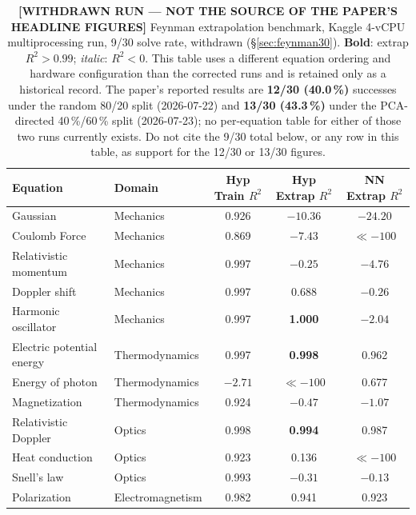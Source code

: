 \documentclass[twoside,11pt]{article}
\newcommand{\Rsq}{R^{2}}
\begin{document}
\begin{table}[h]
\centering
\caption{\textbf{[WITHDRAWN RUN --- NOT THE SOURCE OF THE PAPER'S HEADLINE FIGURES]}
  Feynman extrapolation benchmark, Kaggle 4-vCPU multiprocessing run,
  9/30 solve rate, withdrawn (\S\ref{sec:feynman30}).
  \textbf{Bold}: extrap $\Rsq > 0.99$; \emph{italic}: $\Rsq < 0$.
  This table uses a different equation ordering and hardware configuration
  than the corrected runs and is retained only as a historical record. The
  paper's reported results are \textbf{12/30 (40.0\,\%)} successes under the
  random 80/20 split (2026-07-22) and \textbf{13/30 (43.3\,\%)} under the
  PCA-directed 40\,\%/60\,\% split (2026-07-23); no per-equation table for
  either of those two runs currently exists. Do not cite the 9/30 total
  below, or any row in this table, as support for the 12/30 or 13/30 figures.}
\label{tab:feynman30-legacy}
\small\setlength{\tabcolsep}{4.5pt}
\renewcommand{\arraystretch}{1.08}
\begin{tabular}{llccc}
\toprule
\textbf{Equation} & \textbf{Domain} &
\textbf{Hyp Train $\Rsq$} & \textbf{Hyp Extrap $\Rsq$} & \textbf{NN Extrap $\Rsq$} \\
\midrule
Gaussian                  & Mechanics      & 0.926 & $-10.36$           & $-24.20$ \\
Coulomb Force             & Mechanics      & 0.869 & $-7.43$            & $\ll{-}100$ \\
Relativistic momentum     & Mechanics      & 0.997 & $-0.25$            & $-4.76$ \\
Doppler shift             & Mechanics      & 0.997 & 0.688              & $-0.26$ \\
Harmonic oscillator       & Mechanics      & 0.997 & \textbf{1.000}     & $-2.04$ \\
Electric potential energy & Thermodynamics & 0.997 & \textbf{0.998}     & 0.962 \\
Energy of photon          & Thermodynamics & $-2.71$ & $\ll{-}100$      & 0.677 \\
Magnetization             & Thermodynamics & 0.924 & $-0.47$            & $-1.07$ \\
Relativistic Doppler      & Optics         & 0.998 & \textbf{0.994}     & 0.987 \\
Heat conduction           & Optics         & 0.923 & 0.136              & $\ll{-}100$ \\
Snell's law               & Optics         & 0.993 & $-0.31$            & $-0.13$ \\
Polarization              & Electromagnetism & 0.982 & 0.941            & 0.923 \\

\end{tabular}
\end{table}
\end{document}

